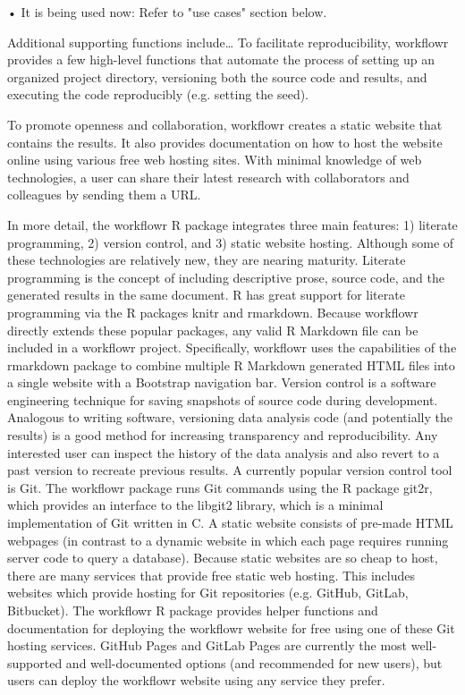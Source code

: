 \documentclass[9pt,a4paper]{extarticle}
\begin{document}
• It is being used now: Refer to "use cases" section below.

Additional supporting functions include… To facilitate reproducibility,
workflowr provides a few high-level functions that automate the process
of setting up an organized project directory, versioning both the source
code and results, and executing the code reproducibly (e.g. setting the
seed).

To promote openness and collaboration, workflowr creates a static
website that contains the results. It also provides documentation on how
to host the website online using various free web hosting sites. With
minimal knowledge of web technologies, a user can share their latest
research with collaborators and colleagues by sending them a URL.

In more detail, the workflowr R package integrates three main features:
1) literate programming, 2) version control, and 3) static website
hosting. Although some of these technologies are relatively new, they
are nearing maturity. Literate programming is the concept of including
descriptive prose, source code, and the generated results in the same
document. R has great support for literate programming via the R
packages knitr and rmarkdown. Because workflowr directly extends these
popular packages, any valid R Markdown file can be included in a
workflowr project. Specifically, workflowr uses the capabilities of the
rmarkdown package to combine multiple R Markdown generated HTML files
into a single website with a Bootstrap navigation bar. Version control
is a software engineering technique for saving snapshots of source code
during development. Analogous to writing software, versioning data
analysis code (and potentially the results) is a good method for
increasing transparency and reproducibility. Any interested user can
inspect the history of the data analysis and also revert to a past
version to recreate previous results. A currently popular version
control tool is Git. The workflowr package runs Git commands using the R
package git2r, which provides an interface to the libgit2 library, which
is a minimal implementation of Git written in C. A static website
consists of pre-made HTML webpages (in contrast to a dynamic website in
which each page requires running server code to query a database).
Because static websites are so cheap to host, there are many services
that provide free static web hosting. This includes websites which
provide hosting for Git repositories (e.g. GitHub, GitLab, Bitbucket).
The workflowr R package provides helper functions and documentation for
deploying the workflowr website for free using one of these Git hosting
services. GitHub Pages and GitLab Pages are currently the most
well-supported and well-documented options (and recommended for new
users), but users can deploy the workflowr website using any service
they prefer.
\end{document}
